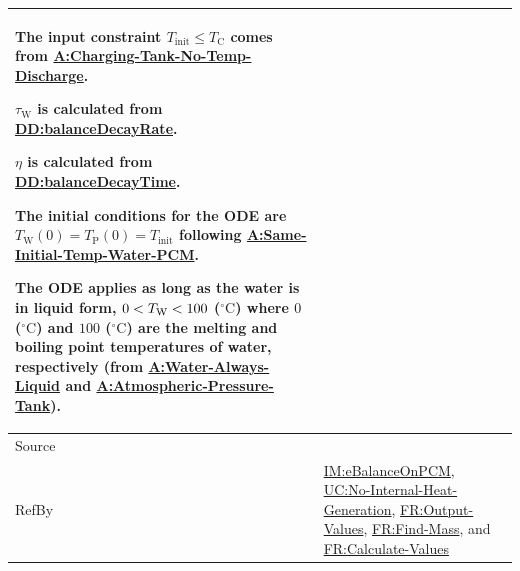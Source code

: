 \documentclass[12pt]{article}
\newcommand{\lt}{\ensuremath <}
\begin{document}
\begin{minipage}{\textwidth}
\begin{tabular}{>{\raggedright}p{}>{\raggedright\arraybackslash}p{}}
        The input constraint ${T_{\text{init}}}\leq{}{T_{\text{C}}}$ comes from \hyperref[assumpCTNOD]{A:Charging-Tank-No-Temp-Discharge}.
        
        ${τ_{\text{W}}}$ is calculated from \hyperref[DD:balanceDecayRate]{DD:balanceDecayRate}.
        
        $η$ is calculated from \hyperref[DD:balanceDecayTime]{DD:balanceDecayTime}.
        
        The initial conditions for the ODE are ${T_{\text{W}}}\left(0\right)={T_{\text{P}}}\left(0\right)={T_{\text{init}}}$ following \hyperref[assumpSITWP]{A:Same-Initial-Temp-Water-PCM}.
        
        The ODE applies as long as the water is in liquid form, $0\lt{}{T_{\text{W}}}\lt{}100$ (${{}^{\circ}\text{C}}$) where $0$ (${{}^{\circ}\text{C}}$) and $100$ (${{}^{\circ}\text{C}}$) are the melting and boiling point temperatures of water, respectively (from \hyperref[assumpWAL]{A:Water-Always-Liquid} and \hyperref[assumpAPT]{A:Atmospheric-Pressure-Tank}).
        
\\ \midrule
Source & \cite{koothoor2013}
         
\\ \midrule
RefBy & \hyperref[IM:eBalanceOnPCM]{IM:eBalanceOnPCM}, \hyperref[unlikeChgNIHG]{UC:No-Internal-Heat-Generation}, \hyperref[outputValues]{FR:Output-Values}, \hyperref[findMass]{FR:Find-Mass}, and \hyperref[calcValues]{FR:Calculate-Values}
        
\\ \bottomrule
\end{tabular}
\end{minipage}
\end{document}

